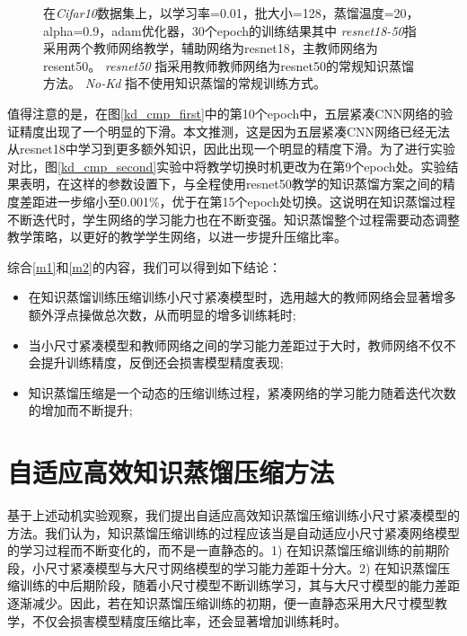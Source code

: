 \begin{figure}[h]
{		\label{kd_cmp_second}}
	\caption{在\emph{Cifar10}数据集上，以学习率=0.01，批大小=128，蒸馏温度=20，alpha=0.9，adam优化器，30个epoch的训练结果其中 \emph{resnet18-50}指采用两个教师网络教学，辅助网络为resnet18，主教师网络为resent50。 \emph{resnet50} 指采用教师教师网络为resnet50的常规知识蒸馏方法。 \emph{No-Kd} 指不使用知识蒸馏的常规训练方式。}
	\label{kd_cmp}
\end{figure}


值得注意的是，在图\ref{kd_cmp_first}中的第10个epoch中，五层紧凑CNN网络的验证精度出现了一个明显的下滑。本文推测，这是因为五层紧凑CNN网络已经无法从resnet18中学习到更多额外知识，因此出现一个明显的精度下滑。为了进行实验对比，图\ref{kd_cmp_second}实验中将教学切换时机更改为在第9个epoch处。实验结果表明，在这样的参数设置下，与全程使用resnet50教学的知识蒸馏方案之间的精度差距进一步缩小至0.001\%，优于在第15个epoch处切换。这说明在知识蒸馏过程不断迭代时，学生网络的学习能力也在不断变强。知识蒸馏整个过程需要动态调整教学策略，以更好的教学学生网络，以进一步提升压缩比率。

综合\ref{m1}和\ref{m2}的内容，我们可以得到如下结论：
\begin{itemize}
	\item 在知识蒸馏训练压缩训练小尺寸紧凑模型时，选用越大的教师网络会显著增多额外浮点操做总次数，从而明显的增多训练耗时;
	\item 当小尺寸紧凑模型和教师网络之间的学习能力差距过于大时，教师网络不仅不会提升训练精度，反倒还会损害模型精度表现;
	\item 知识蒸馏压缩是一个动态的压缩训练过程，紧凑网络的学习能力随着迭代次数的增加而不断提升;
\end{itemize}


\section{自适应高效知识蒸馏压缩方法}
基于上述动机实验观察，我们提出自适应高效知识蒸馏压缩训练小尺寸紧凑模型的方法。我们认为，知识蒸馏压缩训练的过程应该当是自动适应小尺寸紧凑网络模型的学习过程而不断变化的，而不是一直静态的。1) 在知识蒸馏压缩训练的前期阶段，小尺寸紧凑模型与大尺寸网络模型的学习能力差距十分大。2) 在知识蒸馏压缩训练的中后期阶段，随着小尺寸模型不断训练学习，其与大尺寸模型的能力差距逐渐减少。因此，若在知识蒸馏压缩训练的初期，便一直静态采用大尺寸模型教学，不仅会损害模型精度压缩比率，还会显著增加训练耗时。
